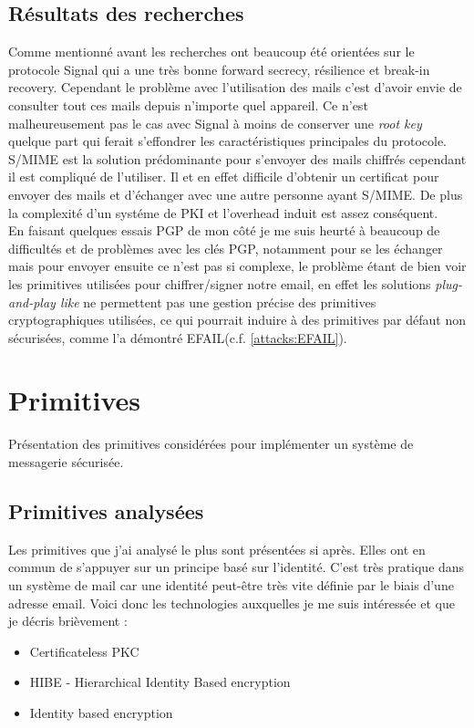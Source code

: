 \subsection{Résultats des recherches}
Comme mentionné avant les recherches ont beaucoup été orientées sur le protocole Signal qui a une très bonne forward secrecy, résilience et break-in recovery. Cependant le problème avec l'utilisation des mails c'est d'avoir envie de consulter tout ces mails depuis n'importe quel appareil. Ce n'est malheureusement pas le cas avec Signal à moins de conserver une \textit{root key} quelque part qui ferait s'effondrer les caractéristiques principales du protocole.\\
S/MIME est la solution prédominante pour s'envoyer des mails chiffrés cependant il est compliqué de l'utiliser. Il et en effet difficile d'obtenir un certificat pour envoyer des mails et d'échanger avec une autre personne ayant S/MIME. De plus la complexité d'un systéme de PKI et l'overhead induit est assez conséquent.\\
En faisant quelques essais PGP de mon côté je me suis heurté à beaucoup de difficultés et de problèmes avec les clés PGP, notamment pour se les échanger mais pour envoyer ensuite ce n'est pas si complexe, le problème étant de bien voir les primitives utilisées pour chiffrer/signer notre email, en effet les solutions \textit{plug-and-play like} ne permettent pas une gestion précise des primitives cryptographiques utilisées, ce qui pourrait induire à des primitives par défaut non sécurisées, comme l'a démontré EFAIL(c.f. \ref{attacks:EFAIL}).
\section{Primitives}
Présentation des primitives considérées pour implémenter un système de messagerie sécurisée.
\subsection{Primitives analysées}
Les primitives que j'ai analysé le plus sont présentées si après. Elles ont en commun de s'appuyer sur un principe basé sur l'identité. C'est très pratique dans un système de mail car une identité peut-être très vite définie par le biais d'une adresse email. Voici donc les technologies auxquelles je me suis intéressée et que je décris brièvement :
\begin{itemize}
	\item Certificateless PKC~\cite{DBLP:conf/asiacrypt/Al-RiyamiP03}
	\item HIBE - Hierarchical Identity Based encryption~\cite{DBLP:conf/eurocrypt/HorwitzL02}
	\item Identity based encryption~\cite{DBLP:conf/crypto/Shamir84}
\end{itemize}
